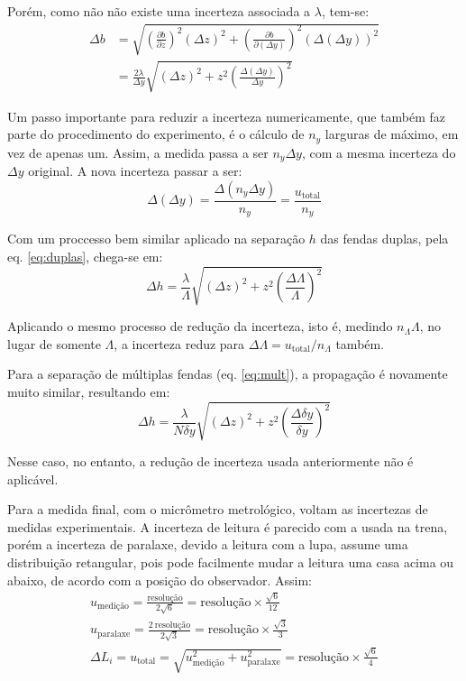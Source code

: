 Porém, como não não existe uma incerteza associada a $\lambda$, tem-se:
\begin{align*}
    \Delta b
        &= \sqrt{\left(\frac{\partial b}{\partial z}\right)^2 (\Delta z)^2 + \left(\frac{\partial b}{\partial (\Delta y)}\right)^2 (\Delta (\Delta y))^2} \\
        &= \frac{2 \lambda}{\Delta y} \sqrt{(\Delta z)^2 + z^2 \left(\frac{\Delta (\Delta y)}{\Delta y}\right)^2}
\end{align*}

Um passo importante para reduzir a incerteza numericamente, que também faz parte do procedimento do experimento, é o cálculo de $n_y$ larguras de máximo, em vez de apenas um. Assim, a medida passa a ser $n_y \Delta y$, com a mesma incerteza do $\Delta y$ original. A nova incerteza passar a ser:
\begin{equation*}
    \Delta (\Delta y) = \frac{\Delta (n_y \Delta y)}{n_y} = \frac{u_\text{total}}{n_y}
\end{equation*}

Com um proccesso bem similar aplicado na separação $h$ das fendas duplas, pela eq. \ref{eq:duplas}, chega-se em:
\begin{equation*}
    \Delta h = \frac{\lambda}{\Lambda} \sqrt{(\Delta z)^2 + z^2 \left(\frac{\Delta \Lambda}{\Lambda}\right)^2}
\end{equation*}

Aplicando o mesmo processo de redução da incerteza, isto é, medindo $n_\Lambda \Lambda$, no lugar de somente $\Lambda$, a incerteza reduz para $\Delta \Lambda = u_\text{total}/n_\Lambda$ também.

Para a separação de múltiplas fendas (eq. \ref{eq:mult}), a propagação é novamente muito similar, resultando em:
\begin{equation*}
    \Delta h = \frac{\lambda}{N \delta y} \sqrt{(\Delta z)^2 + z^2 \left(\frac{\Delta \delta y}{\delta y}\right)^2}
\end{equation*}

Nesse caso, no entanto, a redução de incerteza usada anteriormente não é aplicável.

Para a medida final, com o micrômetro metrológico, voltam as incertezas de medidas experimentais. A incerteza de leitura é parecido com a usada na trena, porém a incerteza de paralaxe, devido a leitura com a lupa, assume uma distribuição retangular, pois pode facilmente mudar a leitura uma casa acima ou abaixo, de acordo com a posição do observador. Assim:
\begin{gather*}
    u_{\text{medição}} = \frac{\text{resolução}}{2 \sqrt{6}} = \text{resolução} \times \frac{\sqrt{6}}{12} \\
    u_{\text{paralaxe}} = \frac{2\ \text{resolução}}{2 \sqrt{3}} = \text{resolução} \times \frac{\sqrt{3}}{3} \\
    \Delta L_i = u_{\text{total}}
        = \sqrt{u_{\text{medição}}^2 + u_{\text{paralaxe}}^2}
        = \text{resolução} \times \frac{\sqrt{6}}{4}
\end{gather*}

